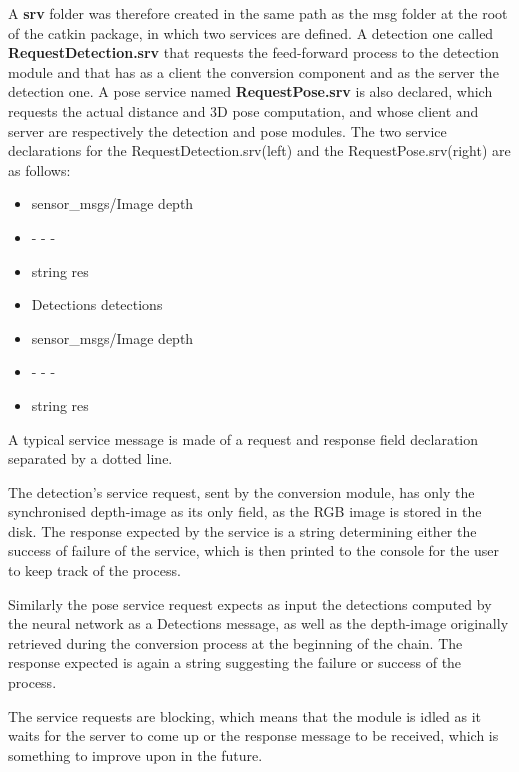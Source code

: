 A \textbf{srv} folder was therefore created in the same path as the msg folder at the root of the catkin package, in which two services are defined. A detection one called \textbf{RequestDetection.srv} that requests the feed-forward process to the detection module and that has as a client the conversion component and as the server the detection one. A pose service named \textbf{RequestPose.srv} is also declared, which requests the actual distance and 3D pose computation, and whose client and server are respectively the detection and pose modules. The two service declarations for the RequestDetection.srv(left) and the RequestPose.srv(right) are as follows:

\begin{multicols}{2}
  \begin{itemize}
    \item sensor\_msgs/Image depth
    \item - - -
    \item string res
  \end{itemize}

  \columnbreak

  \begin{itemize}
    \item Detections detections
    \item sensor\_msgs/Image depth
    \item - - -
    \item string res
  \end{itemize}
\end{multicols}

A typical service message is made of a request and response field declaration separated by a dotted line. 

The detection's service request, sent by the conversion module, has only the synchronised depth-image as its only field, as the RGB image is stored in the disk. The response expected by the service is a string determining either the success of failure of the service, which is then printed to the console for the user to keep track of the process.

Similarly the pose service request expects as input the detections computed by the neural network as a Detections message, as well as the depth-image originally retrieved during the conversion process at the beginning of the chain. The response expected is again a string suggesting the failure or success of the process.

The service requests are blocking, which means that the module is idled as it waits for the server to come up or the response message to be received, which is something to improve upon in the future.


